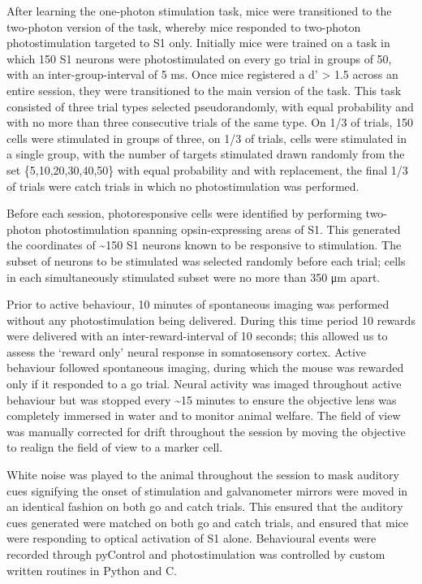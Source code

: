 After learning the one-photon stimulation task, mice were transitioned to the two-photon version of the task, whereby mice responded to two-photon photostimulation targeted to S1 only. Initially mice were trained on a task in which 150 S1 neurons were photostimulated on every go trial in groups of 50, with an inter-group-interval of 5 ms.  Once mice registered a d' > 1.5 across an entire session, they were transitioned to the main version of the task. This task consisted of three trial types selected pseudorandomly, with equal probability and with no more than three consecutive trials of the same type. On 1/3 of trials, 150 cells were stimulated in groups of three, on 1/3 of trials, cells were stimulated in a single group, with the number of targets stimulated drawn randomly from the set \{5,10,20,30,40,50\} with equal probability and with replacement, the final 1/3 of trials were catch trials in which no photostimulation was performed. 

Before each session, photoresponsive cells were identified by performing two-photon photostimulation spanning opsin-expressing areas of S1. This generated the coordinates of \textasciitilde150 S1 neurons known to be responsive to stimulation. The subset of neurons to be stimulated was selected randomly before each trial; cells in each simultaneously stimulated subset were no more than 350 μm apart. 

Prior to active behaviour, 10 minutes of spontaneous imaging was performed without any photostimulation being delivered. During this time period 10 rewards were delivered with an inter-reward-interval of 10 seconds; this allowed us to assess the ‘reward only’ neural response in somatosensory cortex. Active behaviour followed spontaneous imaging, during which the mouse was rewarded only if it responded to a go trial. Neural activity was imaged throughout active behaviour but was stopped every \textasciitilde15 minutes to ensure the objective lens was completely immersed in water and to monitor animal welfare. The field of view was manually corrected for drift throughout the session by moving the objective to realign the field of view to a marker cell.

White noise was played to the animal throughout the session to mask auditory cues signifying the onset of stimulation and galvanometer mirrors were moved in an identical fashion on both go and catch trials. This ensured that the auditory cues generated were matched on both go and catch trials, and ensured that mice were responding to optical activation of S1 alone. Behavioural events were recorded through pyControl and photostimulation was controlled by custom written routines in Python and C.



